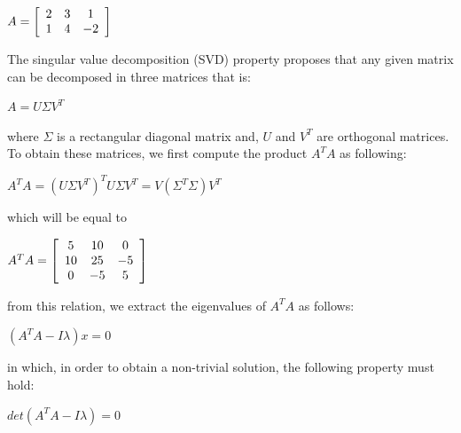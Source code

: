 \documentclass[]{article}
\begin{document}
\vspace{0.5em}

\centerline{ $A = \left[ {\begin{array}{*{20}c}
		2 & 3 & 1 \\
		1 & 4 & -2   
		\end{array} } \right]$ }
	
The singular value decomposition (SVD) property proposes that any given matrix can be decomposed in three matrices that is:

\vspace{0.5em}

\centerline { $A = U \Sigma V^T$}

\vspace{0.5em}

where $\Sigma$ is a rectangular diagonal matrix and, $U$ and $V^T$ are orthogonal matrices. To obtain these matrices, we first compute the product $A^TA$ as following:

\vspace{0.5em}


\centerline {
	$A^TA = (U \Sigma V^T)^T U \Sigma V^T = V (\Sigma^T \Sigma)V^T $ 
}

\vspace{0.5em}


which will be equal to 

\vspace{0.5em}

\centerline{ $A^TA = \left[ {\begin{array}{*{20}c}
		5 & 10 & 0 \\
		10 & 25 & -5 \\ 
		0 & -5 & 5   
		\end{array} } \right]$ 
}

\vspace{0.5em}
	
from this relation, we extract the eigenvalues of $A^TA$ as follows:

\vspace{0.5em}
	
\centerline {
	$(A^TA - I \lambda) x = 0$
}

\vspace{0.5em}

in which, in order to obtain a non-trivial solution, the following property must hold:

\vspace{0.5em}

\centerline {
	$det(A^TA - I \lambda) = 0$
}
\end{document}
